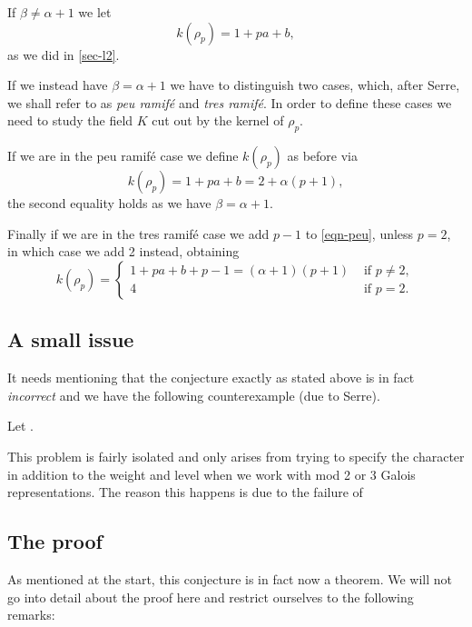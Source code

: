 \documentclass[a4paper,12pt]{article}
\begin{document}
If $\beta \ne \alpha + 1$ we let
\begin{equation}\label{eqn-l1nt}
k(\rho_p) = 1 + pa + b,
\end{equation}
as we did in \cref{sec-l2}.

If we instead have $\beta = \alpha + 1$ we have to distinguish two cases, which, after Serre, we shall refer to as \emph{peu ramif\'e} and \emph{tres ramif\'e}.
In order to define these cases we need to study the field $K$ cut out by the kernel of $\rho_p$.

If we are in the peu ramif\'e case we define $k(\rho_p)$ as before via
\begin{equation}\label{eqn-peu}
k(\rho_p) = 1 + pa + b = 2 + \alpha(p+1),
\end{equation}
the second equality holds as we have $\beta = \alpha + 1$.

Finally if we are in the tres ramif\'e case we add $p-1$ to \cref{eqn-peu}, unless $p=2$, in which case we add 2 instead, obtaining
\begin{equation}\label{eqn-tres}
k(\rho_p) = \begin{cases}
1 + pa + b + p - 1 = (\alpha + 1)(p+1) & \text{ if }p\ne 2,\\
4 & \text{ if } p = 2.
\end{cases}
\end{equation}


\subsection{A small issue}
It needs mentioning that the conjecture exactly as stated above is in fact \emph{incorrect} and we have the following counterexample (due to Serre).

\begin{ex}
Let . %
\end{ex}

This problem is fairly isolated and only arises from trying to specify the character in addition to the weight and level when we work with mod 2 or 3 Galois representations.
The reason this happens is due to the failure of


\subsection{The proof}
As mentioned at the start, this conjecture is in fact now a theorem.
We will not go into detail about the proof here and restrict ourselves to the following remarks:
\end{document}
